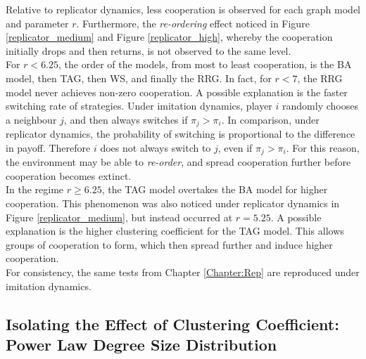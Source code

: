 Relative to replicator dynamics, less cooperation is observed for each graph model and parameter $r$. Furthermore, the \emph{re-ordering} effect noticed in Figure \ref{replicator_medium} and Figure \ref{replicator_high}, whereby the cooperation initially drops and then returns, is not observed to the same level. \\

For $r<6.25$, the order of the models, from most to least cooperation, is the BA model, then TAG, then WS, and finally the RRG. In fact, for $r<7$, the RRG model never achieves non-zero cooperation. A possible explanation is the faster switching rate of strategies. Under imitation dynamics, player $i$ randomly chooses a neighbour $j$, and then always switches if $\pi_j>\pi_i$. In comparison, under replicator dynamics, the probability of switching is proportional to the difference in payoff. Therefore $i$ does not always switch to $j$, even if $\pi_j>\pi_i$. For this reason, the environment may be able to \emph{re-order}, and spread cooperation further before cooperation becomes extinct. \\

In the regime $r\geq 6.25$, the TAG model overtakes the BA model for higher cooperation. This phenomenon was also noticed under replicator dynamics in Figure \ref{replicator_medium}, but instead occurred at $r=5.25$. A possible explanation is the higher clustering coefficient for the TAG model. This allows groups of cooperation to form, which then spread further and induce higher cooperation. \\

For consistency, the same tests from Chapter \ref{Chapter:Rep} are reproduced under imitation dynamics. \\

\subsection{Isolating the Effect of Clustering Coefficient: Power Law Degree Size Distribution}

\FloatBarrier
{}
\FloatBarrier
{} \FloatBarrier

